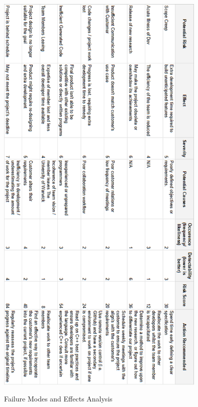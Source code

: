 \begin{table}
    \centering
    \includegraphics[width=10cm]{thesis/diagrams/risks.png}
    \caption{Failure Modes and Effects Analysis}
    \label{tab:fmea}
\end{table}
